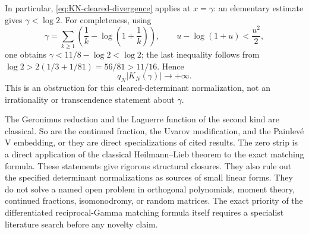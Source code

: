 In particular, \eqref{eq:KN-cleared-divergence} applies at \(x=\gamma\): an
elementary estimate gives \(\gamma<\log2\).  For completeness, using
\[
 \gamma=\sum_{k\geq1}\left(\frac1k-\log\left(1+\frac1k\right)\right),
 \qquad
 u-\log(1+u)<\frac{u^2}{2},
\]
one obtains \(\gamma<11/8-\log2<\log2\); the last inequality follows from
\(\log2>2(1/3+1/81)=56/81>11/16\).  Hence
\[
 q_N|K_N(\gamma)|\longrightarrow+\infty.
\]
This is an obstruction for this cleared-determinant normalization, not an
irrationality or transcendence statement about \(\gamma\).

\begin{remark}
The Geronimus reduction and the Laguerre function of the second kind are
classical.  So are the continued fraction, the Uvarov modification, and the
Painlev\'e V embedding, or they are direct specializations of cited results.
The zero strip is a direct application of the classical Heilmann--Lieb theorem
to the exact matching formula.  These statements give rigorous structural
closures.  They also rule out the specified determinant normalizations as
sources of small linear forms.
They do not solve a named open problem in orthogonal polynomials, moment
theory, continued fractions, isomonodromy, or random matrices.  The exact
priority of the differentiated reciprocal-Gamma matching formula itself
requires a specialist literature search before any novelty claim.
\end{remark}

%
%
%
%
%
%
%
